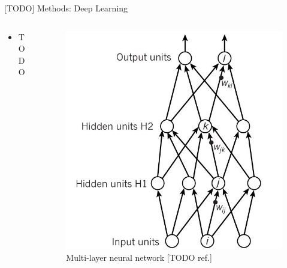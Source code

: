 \documentclass[final,hyperref={pdfpagelabels=false}]{beamer}
\begin{document}
\begin{frame}[t]
\begin{columns}[t]
\begin{column}{.465\textwidth}

\begin{block}{[TODO] Methods: Deep Learning}

\begin{columns} %
\begin{column}{.6\textwidth} %
\begin{itemize}
\item TODO
\end{itemize}
\end{column}

\begin{column}{.4\textwidth} %
\centering

\begin{figure}
\includegraphics[width=.9\linewidth]{nature-deep-learning/fig_1c}
\caption{Multi-layer neural network [TODO ref.]}
\end{figure}
\end{column}
\end{columns} %


\end{block}
\end{column}
\end{columns}
\end{frame}
\end{document}
